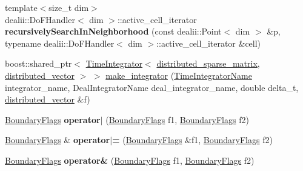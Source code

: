 \begin{DoxyCompactItemize}
\item 
\hypertarget{namespacenatrium_a8469a9edf49968998833895b8468cd5c}{
{\footnotesize template$<$size\_\-t dim$>$ }\\dealii::DoFHandler$<$ dim $>$::active\_\-cell\_\-iterator {\bfseries recursivelySearchInNeighborhood} (const dealii::Point$<$ dim $>$ \&p, typename dealii::DoFHandler$<$ dim $>$::active\_\-cell\_\-iterator \&cell)}
\label{namespacenatrium_a8469a9edf49968998833895b8468cd5c}

\item 
boost::shared\_\-ptr$<$ \hyperlink{classnatrium_1_1TimeIntegrator}{TimeIntegrator}$<$ \hyperlink{namespacenatrium_a860e92befb23651241c8b3d61a0d4034}{distributed\_\-sparse\_\-matrix}, \hyperlink{namespacenatrium_a903d2b92917f582f2ff05f52160ab811}{distributed\_\-vector} $>$ $>$ \hyperlink{namespacenatrium_aaa8bf70405092ec81a8b15331a8f24b5}{make\_\-integrator} (\hyperlink{namespacenatrium_a00a0ec1e80f138680e0fcca78349f6d8}{TimeIntegratorName} integrator\_\-name, DealIntegratorName deal\_\-integrator\_\-name, double delta\_\-t, \hyperlink{namespacenatrium_a903d2b92917f582f2ff05f52160ab811}{distributed\_\-vector} \&f)
\item 
\hypertarget{namespacenatrium_af17fca7c5a3c61dd18e6ccf84deb2622}{
\hyperlink{namespacenatrium_a93b2a3d564675413b9f6cc88c60f46af}{BoundaryFlags} {\bfseries operator$|$} (\hyperlink{namespacenatrium_a93b2a3d564675413b9f6cc88c60f46af}{BoundaryFlags} f1, \hyperlink{namespacenatrium_a93b2a3d564675413b9f6cc88c60f46af}{BoundaryFlags} f2)}
\label{namespacenatrium_af17fca7c5a3c61dd18e6ccf84deb2622}

\item 
\hypertarget{namespacenatrium_a0be22caa54ac298120530e48e1c342fe}{
\hyperlink{namespacenatrium_a93b2a3d564675413b9f6cc88c60f46af}{BoundaryFlags} \& {\bfseries operator$|$=} (\hyperlink{namespacenatrium_a93b2a3d564675413b9f6cc88c60f46af}{BoundaryFlags} \&f1, \hyperlink{namespacenatrium_a93b2a3d564675413b9f6cc88c60f46af}{BoundaryFlags} f2)}
\label{namespacenatrium_a0be22caa54ac298120530e48e1c342fe}

\item 
\hypertarget{namespacenatrium_a03675a37450a8851ae857f52ed79debe}{
\hyperlink{namespacenatrium_a93b2a3d564675413b9f6cc88c60f46af}{BoundaryFlags} {\bfseries operator\&} (\hyperlink{namespacenatrium_a93b2a3d564675413b9f6cc88c60f46af}{BoundaryFlags} f1, \hyperlink{namespacenatrium_a93b2a3d564675413b9f6cc88c60f46af}{BoundaryFlags} f2)}
\label{namespacenatrium_a03675a37450a8851ae857f52ed79debe}


\end{DoxyCompactItemize}

